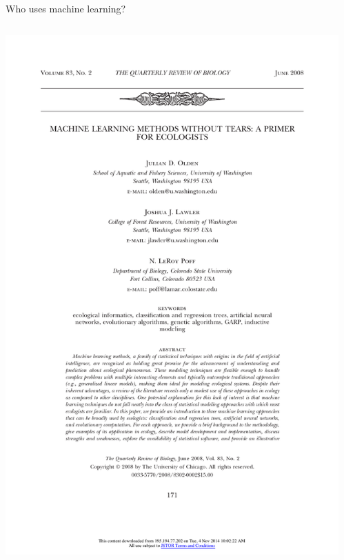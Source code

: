 \documentclass[pdf]{beamer}
\begin{document}
\begin{frame}{Who uses machine learning?}
\begin{columns}
\begin{center}
	\includegraphics[width=\textwidth]{useML02.pdf}
\end{center}
\begin{center}

\end{center}
\end{columns}
\end{frame}
\end{document}
